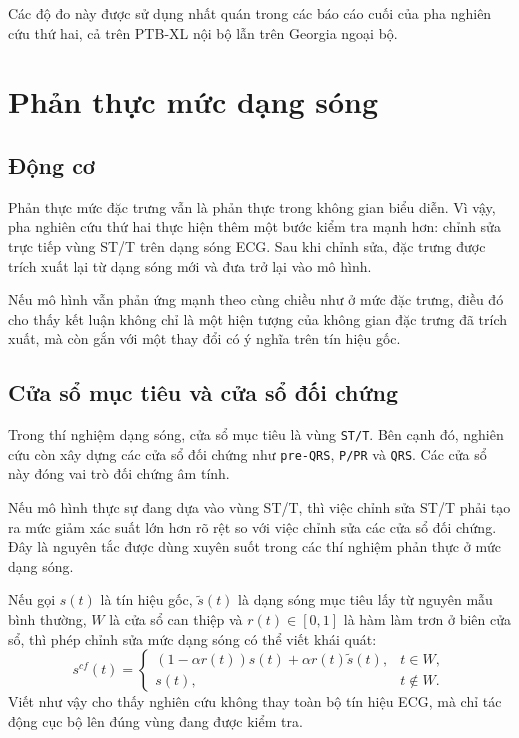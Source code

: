 \blocksep

Các độ đo này được sử dụng nhất quán trong các báo cáo cuối của pha nghiên cứu thứ hai, cả trên PTB-XL nội bộ lẫn trên Georgia ngoại bộ.

\section{Phản thực mức dạng sóng}

\blocksep

\subsection{Động cơ}

\blocksep

Phản thực mức đặc trưng vẫn là phản thực trong không gian biểu diễn. Vì vậy, pha nghiên cứu thứ hai thực hiện thêm một bước kiểm tra mạnh hơn: chỉnh sửa trực tiếp vùng ST/T trên dạng sóng ECG. Sau khi chỉnh sửa, đặc trưng được trích xuất lại từ dạng sóng mới và đưa trở lại vào mô hình.

\blocksep

Nếu mô hình vẫn phản ứng mạnh theo cùng chiều như ở mức đặc trưng, điều đó cho thấy kết luận không chỉ là một hiện tượng của không gian đặc trưng đã trích xuất, mà còn gắn với một thay đổi có ý nghĩa trên tín hiệu gốc.

\blocksep

\subsection{Cửa sổ mục tiêu và cửa sổ đối chứng}

\blocksep

Trong thí nghiệm dạng sóng, cửa sổ mục tiêu là vùng \texttt{ST/T}. Bên cạnh đó, nghiên cứu còn xây dựng các cửa sổ đối chứng như \texttt{pre-QRS}, \texttt{P/PR} và \texttt{QRS}. Các cửa sổ này đóng vai trò đối chứng âm tính.

\blocksep

Nếu mô hình thực sự đang dựa vào vùng ST/T, thì việc chỉnh sửa ST/T phải tạo ra mức giảm xác suất lớn hơn rõ rệt so với việc chỉnh sửa các cửa sổ đối chứng. Đây là nguyên tắc được dùng xuyên suốt trong các thí nghiệm phản thực ở mức dạng sóng.

\blocksep

Nếu gọi $s(t)$ là tín hiệu gốc, $\tilde{s}(t)$ là dạng sóng mục tiêu lấy từ nguyên mẫu bình thường, $W$ là cửa sổ can thiệp và $r(t) \in [0,1]$ là hàm làm trơn ở biên cửa sổ, thì phép chỉnh sửa mức dạng sóng có thể viết khái quát:
\[
s^{cf}(t) =
\begin{cases}
\left(1-\alpha r(t)\right)s(t) + \alpha r(t)\tilde{s}(t), & t \in W,\\
s(t), & t \notin W.
\end{cases}
\]
Viết như vậy cho thấy nghiên cứu không thay toàn bộ tín hiệu ECG, mà chỉ tác động cục bộ lên đúng vùng đang được kiểm tra.

